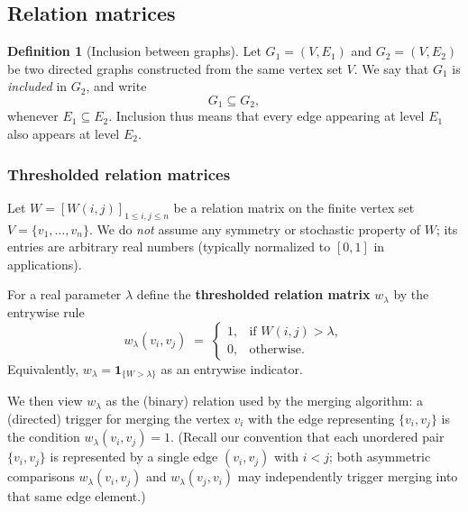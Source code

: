 \documentclass{article}
\theoremstyle{definition}
\newtheorem{definition}{Definition}
\theoremstyle{plain}
\theoremstyle{remark}
\newcommand{\1}{\mathbbm{1}}  %
\begin{document}
\subsection{Relation matrices}

\begin{definition}[Inclusion between graphs]
\label{def:graph-inclusion}
Let $G_{1}=(V,E_{1})$ and
$G_{2}=(V,E_{2})$ be two directed graphs constructed from
the same vertex set $V$.
We say that $G_{1}$ is \emph{included} in $G_{2}$,
and write
\[
G_{1} \subseteq G_{2},
\]
whenever $E_{1}\subseteq E_{2}$.
Inclusion thus means that every edge appearing at level $E_1$ also
appears at level $E_2$.
\end{definition}
 
\subsubsection*{Thresholded relation matrices}

Let \(W = [W(i,j)]_{1\le i,j\le n}\) be a relation matrix on the
finite vertex set \(V=\{v_1,\dots,v_n\}\).  We do \emph{not} assume any
symmetry or stochastic property of \(W\); its entries are arbitrary real
numbers (typically normalized to \([0,1]\) in applications).

For a real parameter \(\lambda\) define the {\bf thresholded relation matrix}
\(w_\lambda\) by the entrywise rule
\begin{equation}\label{eq:threshold-matrix}
    w_\lambda(v_i,v_j) \;=\; 
    \begin{cases}
      1, & \text{if } W(i,j) > \lambda,\\[4pt]
      0, & \text{otherwise.}
    \end{cases}
\end{equation}
Equivalently, \(w_\lambda = \mathbf{1}_{\{W>\lambda\}}\) as an entrywise
indicator.

We then view \(w_\lambda\) as the (binary) relation used by the merging
algorithm: a (directed) trigger for merging the vertex \(v_i\) with the
edge representing \(\{v_i,v_j\}\) is the condition \(w_\lambda(v_i,v_j)=1\).
(Recall our convention that each unordered pair \(\{v_i,v_j\}\) is represented
by a single edge \((v_i,v_j)\) with \(i<j\); both asymmetric comparisons
\(w_\lambda(v_i,v_j)\) and \(w_\lambda(v_j,v_i)\) may independently trigger
merging into that same edge element.)

\medskip
\end{document}
